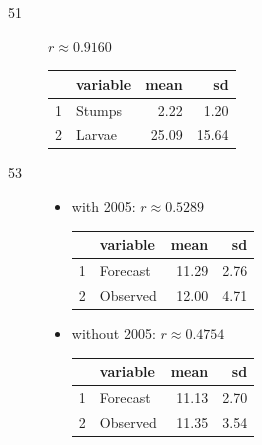 \documentclass[letterpaper, landscape]{exam}
\begin{document}
\begin{description}
      \item[51] $r \approx 0.9160$

        \begin{tabular}{rlrr}
          \toprule
             & variable & mean  & sd \\
          \midrule
          1  & Stumps   & 2.22  & 1.20 \\
          2  & Larvae   & 25.09 & 15.64 \\
          \bottomrule
        \end{tabular}


      \item[53]
        \begin{itemize}
          \item with 2005: $r \approx 0.5289$

            \begin{tabular}{rlrr}
              \toprule
                & variable & mean  & sd \\
              \midrule
              1 & Forecast & 11.29 & 2.76 \\
              2 & Observed & 12.00 & 4.71 \\
              \bottomrule
            \end{tabular}


          \item without 2005: $r \approx 0.4754$

          \begin{tabular}{rlrr}
            \toprule
              & variable & mean  & sd \\
            \midrule
            1 & Forecast & 11.13 & 2.70 \\ 
            2 & Observed & 11.35 & 3.54 \\ 
            \bottomrule
          \end{tabular}
        \end{itemize}

    \end{description}
  \fi
\end{document}
